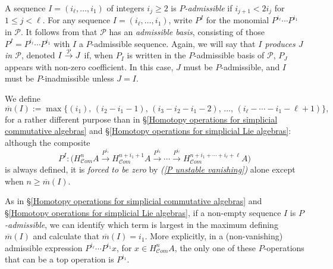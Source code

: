 \documentclass[11pt]{amsart} \renewcommand{\baselinestretch}{1.2}
\theoremstyle{plain}
\newtheorem{lem}[thm]{Lemma}
\theoremstyle{definition}
\renewcommand{\to}{\longrightarrow}
\newcommand{\scrC}{\mathscr{C}}
\newcommand{\calP}{\mathcal{P}}
\newcommand{\Palg}{{\calP}}
\newcommand{\minDimP}{\overline{m}}
\newcommand{\minDimDelta}{m}
\newcommand{\produces}[3]{#3:#1\sim #2}
\renewcommand{\produces}[3]{#1\rightarrow_{#3} #2}%
\renewcommand{\produces}[3]{#1\overset{\smash{#3}}{\rightarrow} #2}%
\newcommand{\algs}{{\scrC\!\textit{om}}}
\begin{document}
\begin{Constructing cohomology operations}
A sequence $I=(i_\ell,\ldots,i_1)$ of integers $i_j\geq2$ is \emph{$P$-admissible} if $i_{j+1}<2i_j$ for $1\leq j <\ell$. For any sequence $I=(i_\ell,\ldots,i_1)$, write $P^I$ for the monomial $P^{i_\ell}\cdots P^{i_1}$ in $\Palg$. It follows from \cite[Theorem I]{MR1089001} that $\Palg$ has an \emph{admissible basis}, consisting of those $P^I=P^{i_\ell}\cdots P^{i_{1}}$ with $I$ a $P$-admissible sequence.  Again, we will say that \emph{$I$ produces $J$ in $\Palg$}, denoted $\produces{I}{J}{\Palg}$ if, when $P_I$ is written in the $P$-admissible basis of $\Palg$, $P_J$ appears with non-zero coefficient. In this case, $J$ must be $P$-admissible, and $I$ must be $P$-inadmissible unless $J=I$.

We define
\[\minDimP(I):=\max\{(i_1),\,(i_2-i_1-1),\,(i_3-i_2-i_1-2),\,\ldots,\,(i_{\ell}-\cdots-i_1-\ell+1)\},\]
for a rather different purpose than in \S\ref{Homotopy operations for simplicial commutative algebras} and \S\ref{Homotopy operations for simplicial Lie algebras}: although the composite 
\[P^I:\bigl(H_{\algs}^{n}A\overset{P^{i_1}}{\to}H_{\algs}^{n+i_1+1}A\overset{P^{i_2}}{\to}\cdots \overset{P^{i_\ell}}{\to}H_{\algs}^{n+i_1+\cdots +i_\ell+\ell}A\bigr)\]
is always defined, it is \emph{forced to be zero} by \emph{(\ref{P unstable vanishing})} alone except  when $n\geq\minDimP(I)$.

As in \S\ref{Homotopy operations for simplicial commutative algebras} and \S\ref{Homotopy operations for simplicial Lie algebras}, if a non-empty sequence $I$  is \emph{$P$-admissible}, we can identify which term is largest in the maximum defining $\minDimP(I)$ and calculate that $\minDimP(I)=i_1$. More explicitly, in a (non-vanishing) admissible expression $P^{i_\ell}\cdots P^{i_1}x$, for $x\in H^n_{\algs}A$, the only one of these $P$-operations that can be a top operation is $P^{i_{1}}$.




\end{Constructing cohomology operations}
\end{document}
